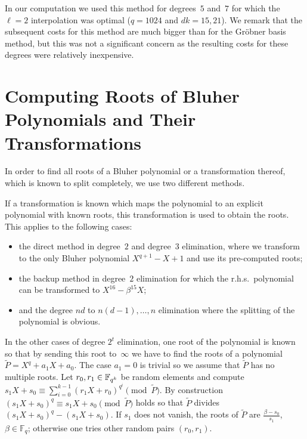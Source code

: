 \documentclass[11pt]{llncs}
\newcommand{\F}{\mathbb F}
\begin{document}
In our computation we used this method for degrees~$5$ and~$7$ for
which the $\ell = 2$ interpolation was optimal ($q = 1024$ and
$d k = 15, 21$).  We remark that the subsequent costs for this method
are much bigger than for the Gr\"obner basis method, but this was not
a significant concern as the resulting costs for these degrees were
relatively inexpensive.


\section{Computing Roots of Bluher Polynomials and Their Transformations}\label{sec:BluherRoots}

In order to find all roots of a Bluher polynomial or a transformation
thereof, which is known to split completely, we use two different methods.

If a transformation is known which maps the polynomial to an explicit
polynomial with known roots, this transformation is used to obtain the
roots. This applies to the following cases:
\begin{itemize}
\item the direct method in degree~$2$ and degree~$3$ elimination,
  where we transform to the only Bluher polynomial $X^{q+1}-X+1$ and
  use its pre-computed roots;
\item the backup method in degree~$2$ elimination for which the
  r.h.s.\ polynomial can be transformed to $X^{16} - \beta^{15} X$;
\item and the degree $n d$ to $n (d \!-\! 1), \dots, n$ elimination
  where the splitting of the polynomial is obvious.
\end{itemize}

In the other cases of degree $2^t$ elimination, one root of the
polynomial is known so that by sending this root to~$\infty$ we have
to find the roots of a polynomial $\tilde P = X^q + a_1 X + a_0$.
The case $a_1 = 0$ is trivial so we assume that $\tilde P$ has no
multiple roots.  Let $r_0, r_1 \in \smash{\F_{q^k}}$ be random elements
and compute $s_1 X + s_0 \equiv \sum_{i=0}^{k-1} (r_1 X + r_0)^{q^i} \pmod
{\tilde P}$.  By construction $(s_1 X + s_0)^q \equiv s_1 X + s_0
\pmod{\tilde P}$ holds so that $\tilde P$ divides $(s_1 X + s_0)^q
- (s_1 X + s_0)$.  If $s_1$ does not vanish, the roots of $\tilde P$
are $\frac {\beta - s_0} {s_1}$, $\beta \in \F_q$; otherwise one tries
other random pairs $(r_0, r_1)$.
\end{document}

